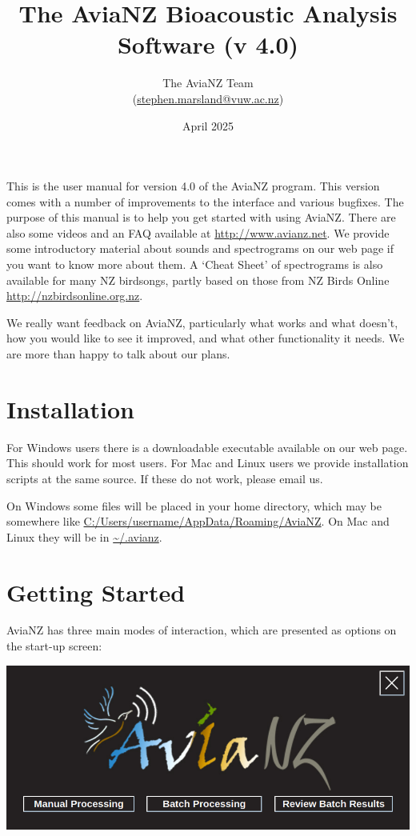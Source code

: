 \documentclass{article}
\title{The AviaNZ Bioacoustic Analysis Software (v 4.0)}
\author{The AviaNZ Team \\(\url{stephen.marsland@vuw.ac.nz})}
\date{April 2025}
\begin{document}
\maketitle

This is the user manual for version 4.0 of the AviaNZ program. This version comes with a number of improvements to the interface and various bugfixes. The purpose of this manual is to help you get started with using AviaNZ. There are also some videos and an FAQ available at \url{http://www.avianz.net}. We provide some introductory material about sounds and spectrograms on our web page if you want to know more about them. A `Cheat Sheet' of spectrograms is also available for many NZ birdsongs, partly based on those from NZ Birds Online \url{http://nzbirdsonline.org.nz}.
 
We really want feedback on AviaNZ, particularly what works and what doesn't, how you would like to see it improved, and what other functionality it needs. We are more than happy to talk about our plans. 

\tableofcontents

\newpage
\section{Installation}

For Windows users there is a downloadable executable available on our web page. This should work for most users. For Mac and Linux users we provide installation scripts at the same source. If these do not work, please email us.

On Windows some files will be placed in your home directory, which may be somewhere like \url{C:/Users/username/AppData/Roaming/AviaNZ}. On Mac and Linux they will be in \url{~/.avianz}. 

\section{Getting Started}

AviaNZ has three main modes of interaction, which are presented as options on the start-up screen:

\begin{center}
\includegraphics[width=.6\textwidth]{Figures/Splashscreen}
\end{center}
\end{document}
